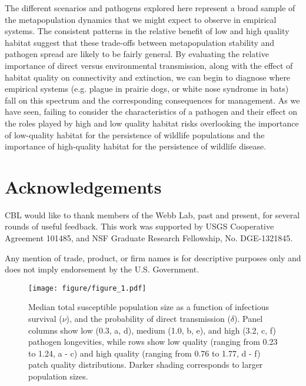 \documentclass{article}
\begin{document}
The different scenarios and pathogens explored here represent a broad sample of the metapopulation dynamics that we might expect to observe in empirical systems.
The consistent patterns in the relative benefit of low and high quality habitat suggest that these trade-offs between metapopulation stability and pathogen spread are likely to be fairly general.  
By evaluating the relative importance of direct versus environmental transmission, along with the effect of habitat quality on connectivity and extinction, we can begin to diagnose where empirical systems (e.g. plague in prairie dogs, or white nose syndrome in bats) fall on this spectrum and the corresponding consequences for management.
As we have seen, failing to consider the characteristics of a pathogen and their effect on the roles played by high and low quality habitat risks overlooking the importance of low-quality habitat for the persistence of wildlife populations and the importance of high-quality habitat for the persistence of wildlife disease.

\section{Acknowledgements}

CBL would like to thank members of the Webb Lab, past and present, for several rounds of useful feedback.  This work was supported by USGS Cooperative Agreement 101485, and NSF Graduate Research Fellowship, No. DGE-1321845.

Any mention of trade, product, or firm names is for descriptive purposes only and does not imply endorsement by the U.S. Government.

\clearpage

     

\clearpage

\begin{figure}
\texttt{[image: figure/figure\_1.pdf]}
\caption{Median total susceptible population size as a function of infectious survival ($\nu$), and the probability of direct transmission ($\delta$).  Panel columns show low (0.3, a, d), medium (1.0, b, e), and high (3.2, c, f) pathogen longevities, while rows show low quality (ranging from 0.23 to 1.24, a - c) and high quality (ranging from 0.76 to 1.77, d - f) patch quality distributions.  Darker shading corresponds to larger population sizes.}
\label{endemic}
\end{figure}
\end{document}
